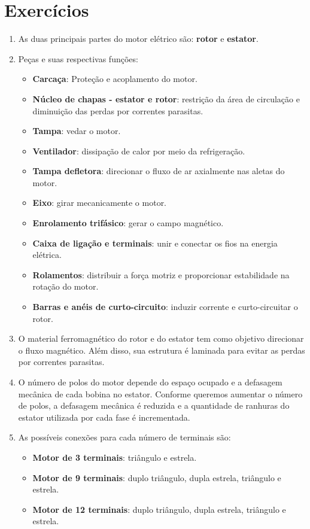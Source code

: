 \documentclass[a4paper,12pt,oneside]{article}
\begin{document}
\newpage
\section{Exercícios}

\renewcommand{\labelenumi}{$\textbf{\textcolor{Azul}{\arabic{enumi}.}}$}
\renewcommand{\labelenumii}{$\textbf{\textcolor{Azul}{(\alph{enumii})}}$}
\renewcommand{\labelitemi}{\textbf{+}}

\begin{enumerate}
\item As duas principais partes do motor elétrico são: \textbf{rotor} e \textbf{estator}.

\item Peças e suas respectivas funções:
\begin{itemize}
\item \textbf{Carcaça}: Proteção e acoplamento do motor.
\item \textbf{Núcleo de chapas - estator e rotor}: restrição da área de circulação e diminuição das perdas por correntes parasitas.
\item \textbf{Tampa}: vedar o motor.
\item \textbf{Ventilador}: dissipação de calor por meio da refrigeração.
\item \textbf{Tampa defletora}: direcionar o fluxo de ar axialmente nas aletas do motor.
\item \textbf{Eixo}: girar mecanicamente o motor.
\item \textbf{Enrolamento trifásico}: gerar o campo magnético.
\item \textbf{Caixa de ligação e terminais}: unir e conectar os fios na energia elétrica.
\item \textbf{Rolamentos}: distribuir a força motriz e proporcionar estabilidade na rotação do motor.
\item \textbf{Barras e anéis de curto-circuito}: induzir corrente e curto-circuitar o rotor.
\end{itemize}
\item O material ferromagnético do rotor e do estator tem como objetivo direcionar o fluxo magnético. Além disso, sua estrutura é laminada para evitar as perdas por correntes parasitas.

\item O número de polos do motor depende do espaço ocupado e a defasagem mecânica de cada bobina no estator. Conforme queremos aumentar o número de polos, a defasagem mecânica é reduzida e a quantidade de ranhuras do estator utilizada por cada fase é incrementada.

\item As possíveis conexões para cada número de terminais são:
\begin{itemize}
\item \textbf{Motor de 3 terminais}: triângulo e estrela.
\item \textbf{Motor de 9 terminais}: duplo triângulo, dupla estrela, triângulo e estrela.
\item \textbf{Motor de 12 terminais}: duplo triângulo, dupla estrela, triângulo e estrela.
\end{itemize}

\end{enumerate}
\end{document}
